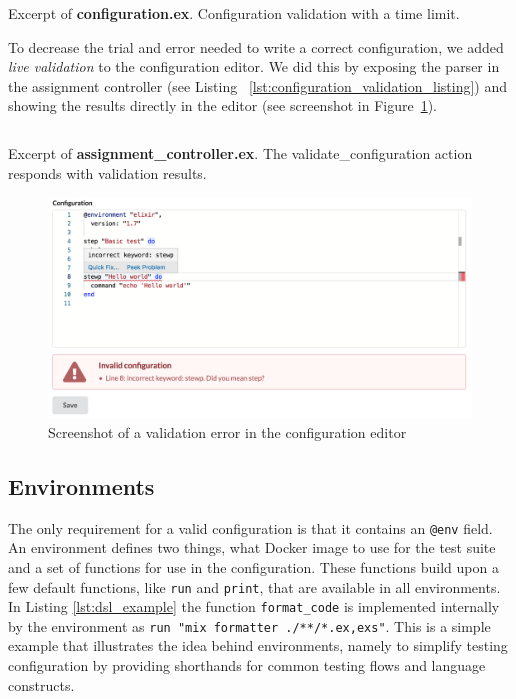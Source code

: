 \begin{listing}
    \inputminted[firstline=14,lastline=24]{elixir}{code/server/lib/thesis/configuration.ex}
    \caption{Excerpt of \textbf{configuration.ex}. Configuration validation with a time limit.}
    \label{lst:configuration_parser}
\end{listing}

To decrease the trial and error needed to write a correct configuration, we added \emph{live validation} to the configuration editor. We did this by exposing the parser in the assignment controller (see Listing ~\ref{lst:configuration_validation_listing}) and showing the results directly in the editor (see screenshot in Figure~\ref{fig:editor_screenshot}).

\begin{listing}
    \inputminted[firstline=29,lastline=36]{elixir}{code/server/lib/thesis_web/controllers/assignment_controller.ex}
    \caption{Excerpt of \textbf{assignment\_controller.ex}. The validate\_configuration action responds with validation results.}
    \label{lst:configuration_validation_listing}
\end{listing}

\begin{figure}
    \centering
    \includegraphics[width=\textwidth]{figure/screenshot_editor.png}
    \caption{Screenshot of a validation error in the configuration editor}
    \label{fig:editor_screenshot}
\end{figure}

\subsection{Environments}
The only requirement for a valid configuration is that it contains an \texttt{@env} field. An environment defines two things, what Docker image to use for the test suite and a set of functions for use in the configuration. These functions build upon a few default functions, like \texttt{run} and \texttt{print}, that are available in all environments. In Listing \ref{lst:dsl_example} the function \texttt{format_code} is implemented internally by the environment as \texttt{run "mix formatter ./**/*.{ex,exs}"}. This is a simple example that illustrates the idea behind environments, namely to simplify testing configuration by providing shorthands for common testing flows and language constructs.

